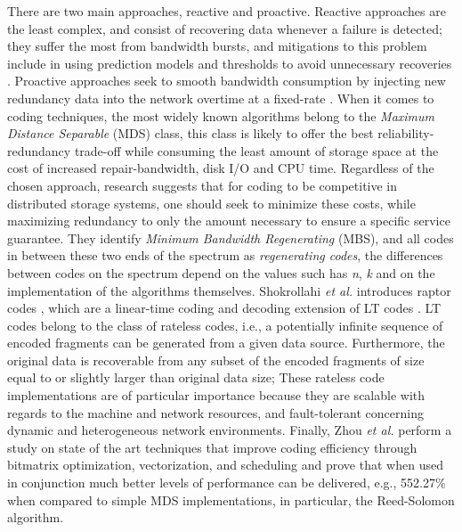 \documentclass[runningheads]{llncs}
\begin{document}
There are two main approaches, reactive and proactive. Reactive approaches are the least complex, and consist of recovering data whenever a failure is detected; they suffer the most from bandwidth bursts, and mitigations to this problem include in using prediction models and thresholds to avoid unnecessary recoveries \cite{lifetime-reactive, efficient-replica-mng-reactive}. Proactive approaches seek to smooth bandwidth consumption by injecting new redundancy data into the network overtime at a fixed-rate \cite{proactive-rep, reliability-without-availability}. When it comes to coding techniques, the most widely known algorithms belong to the \textit{Maximum Distance Separable} (MDS) class, this class is likely to offer the best reliability-redundancy trade-off while consuming the least amount of storage space at the cost of increased repair-bandwidth, disk I/O and CPU time. Regardless of the chosen approach, research \cite{network-coding-for-dss} suggests that for coding to be competitive in distributed storage systems, one should seek to minimize these costs, while maximizing redundancy to only the amount necessary to ensure a specific service guarantee. They identify \textit{Minimum Bandwidth Regenerating} (MBS), and all codes in between these two ends of the spectrum as \textit{regenerating codes}, the differences between codes on the spectrum depend on the values such has \textit{n}, \textit{k} and on the implementation of the algorithms themselves. Shokrollahi \textit{et al.} introduces raptor codes \cite{raptor-codes}, which are a linear-time coding and decoding extension of LT codes \cite{lt-codes}. LT codes belong to the class of rateless codes, i.e., a potentially infinite sequence of encoded fragments can be generated from a given data source. Furthermore, the original data is recoverable from any subset of the encoded fragments of size equal to or slightly larger than original data size; These rateless code implementations are of particular importance because they are scalable with regards to the machine and network resources,  and fault-tolerant concerning dynamic and heterogeneous network environments. Finally, Zhou \textit{et al.} \cite{fast_coding} perform a study on state of the art techniques that improve coding efficiency through bitmatrix optimization, vectorization, and scheduling and prove that when used in conjunction much better levels of performance can be delivered, e.g., 552.27\% when compared to simple MDS implementations, in particular, the Reed-Solomon algorithm.
\end{document}
